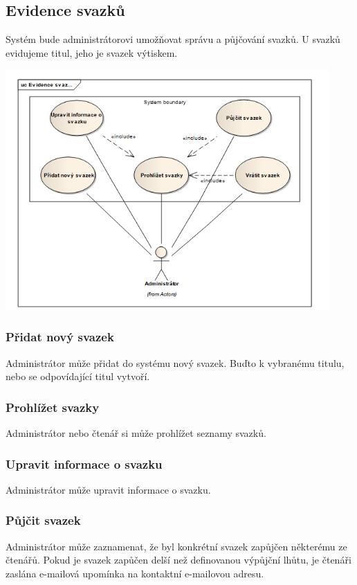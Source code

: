 \documentclass{article}
\begin{document}
\newpage
\subsection{Evidence svazků}
Systém bude administrátorovi umožňovat správu a půjčování svazků. U svazků
evidujeme titul, jeho je svazek výtiskem.

\includegraphics[width=350pt]{img/evidencesvazku.png}
\subsubsection{Přidat nový svazek}
Administrátor může přidat do systému nový svazek. Buďto k vybranému titulu, nebo
se odpovídající titul vytvoří.

\subsubsection{Prohlížet svazky}
Administrátor nebo čtenář si může prohlížet seznamy svazků.

\subsubsection{Upravit informace o svazku}
Administrátor může upravit informace o svazku.

\subsubsection{Půjčit svazek}
Administrátor může zaznamenat, že byl konkrétní svazek zapůjčen některému ze
čtenářů. Pokud je svazek zapůčen delší než definovanou výpůjční lhůtu, je
čtenáři zaslána e-mailová upomínka na kontaktní e-mailovou adresu.
\end{document}

